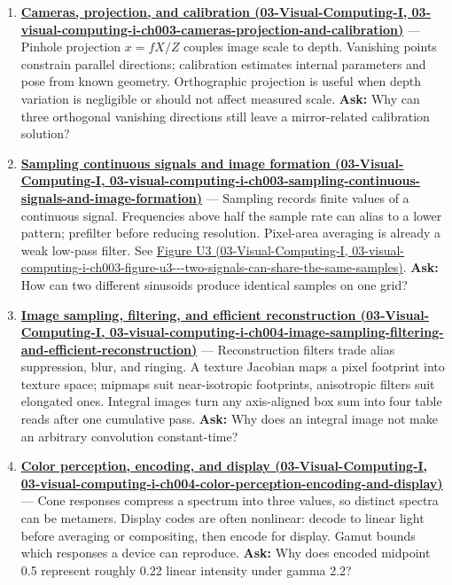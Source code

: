 \begin{enumerate}
\item
  \textbf{\href{../03-Visual-Computing-I/main.pdf\#nameddest=03-visual-computing-i-ch003-cameras-projection-and-calibration}{Cameras, projection, and calibration (03-Visual-Computing-I, 03-visual-computing-i-ch003-cameras-projection-and-calibration)}} --- Pinhole projection \(x=fX/Z\) couples image scale to depth. Vanishing points constrain parallel directions; calibration estimates internal parameters and pose from known geometry. Orthographic projection is useful when depth variation is negligible or should not affect measured scale. \textbf{Ask:} Why can three orthogonal vanishing directions still leave a mirror-related calibration solution?
\item
  \textbf{\href{../03-Visual-Computing-I/main.pdf\#nameddest=03-visual-computing-i-ch003-sampling-continuous-signals-and-image-formation}{Sampling continuous signals and image formation (03-Visual-Computing-I, 03-visual-computing-i-ch003-sampling-continuous-signals-and-image-formation)}} --- Sampling records finite values of a continuous signal. Frequencies above half the sample rate can alias to a lower pattern; prefilter before reducing resolution. Pixel-area averaging is already a weak low-pass filter. See \href{../03-Visual-Computing-I/main.pdf\#nameddest=03-visual-computing-i-ch003-figure-u3---two-signals-can-share-the-same-samples}{Figure U3 (03-Visual-Computing-I, 03-visual-computing-i-ch003-figure-u3-\/-\/-two-signals-can-share-the-same-samples)}. \textbf{Ask:} How can two different sinusoids produce identical samples on one grid?
\item
  \textbf{\href{../03-Visual-Computing-I/main.pdf\#nameddest=03-visual-computing-i-ch004-image-sampling-filtering-and-efficient-reconstruction}{Image sampling, filtering, and efficient reconstruction (03-Visual-Computing-I, 03-visual-computing-i-ch004-image-sampling-filtering-and-efficient-reconstruction)}} --- Reconstruction filters trade alias suppression, blur, and ringing. A texture Jacobian maps a pixel footprint into texture space; mipmaps suit near-isotropic footprints, anisotropic filters suit elongated ones. Integral images turn any axis-aligned box sum into four table reads after one cumulative pass. \textbf{Ask:} Why does an integral image not make an arbitrary convolution constant-time?
\item
  \textbf{\href{../03-Visual-Computing-I/main.pdf\#nameddest=03-visual-computing-i-ch004-color-perception-encoding-and-display}{Color perception, encoding, and display (03-Visual-Computing-I, 03-visual-computing-i-ch004-color-perception-encoding-and-display)}} --- Cone responses compress a spectrum into three values, so distinct spectra can be metamers. Display codes are often nonlinear: decode to linear light before averaging or compositing, then encode for display. Gamut bounds which responses a device can reproduce. \textbf{Ask:} Why does encoded midpoint 0.5 represent roughly 0.22 linear intensity under gamma 2.2?

\end{enumerate}
